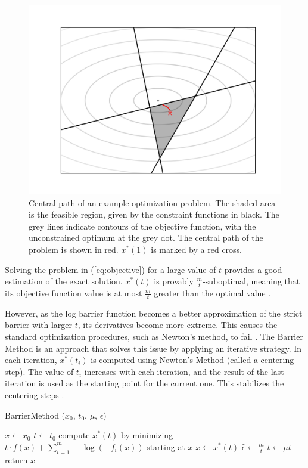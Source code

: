 \documentclass[12pt, a4paper]{report}
\begin{document}
\begin{figure}
    \centering
    \includegraphics[scale=0.6]{figs/barrier_method_example.png}
    \caption{Central path of an example optimization problem. The shaded area is the feasible region, given by the constraint functions in black. The grey lines indicate contours of the objective function, with the unconstrained optimum at the grey dot. The central path of the problem is shown in red. $x^*(1)$ is marked by a red cross.}
    \label{fig:barrier_method_example}
\end{figure}

Solving the problem in (\ref{eq:objective}) for a large value of $t$ provides a good estimation of the exact solution.
$x^*(t)$ is provably $\frac{m}{t}$-suboptimal, meaning that its objective function value is at most $\frac{m}{t}$ greater than the optimal value \cite[566]{boyd}.

However, as the log barrier function becomes a better approximation of the strict barrier with larger $t$, its derivatives become more extreme.
This causes the standard optimization procedures, such as Newton's method, to fail \cite[564]{boyd}.
The Barrier Method is an approach that solves this issue by applying an iterative strategy.
In each iteration, $x^*(t_i)$ is computed using Newton's Method (called a centering step).
The value of $t_i$ increases with each iteration, and the result of the last iteration is used as the starting point for the current one.
This stabilizes the centering steps \cite[569]{boyd}. 

\begin{algorithm}
    \caption[The basic Barrier Method.]{BarrierMethod ($x_0$, $t_0$, $\mu$, $\epsilon$)}
    \label{alg:product_axes}
    \begin{algorithmic}
        \State $x \gets x_0$
        \State $t \gets t_0$
        \Repeat
            \State compute $x^*(t)$ by minimizing $t \cdot f(x) + \sum_{i=1}^m -\log(-f_i(x))$ starting at $x$
            \State $x \gets x^*(t)$
            \State $\hat{\epsilon} \gets \frac{m}{t}$
            \State $t \gets \mu t$
        \Until{$\hat{\epsilon} < \epsilon$}
        \State return $x$
    \end{algorithmic}
\end{algorithm}
\end{document}
